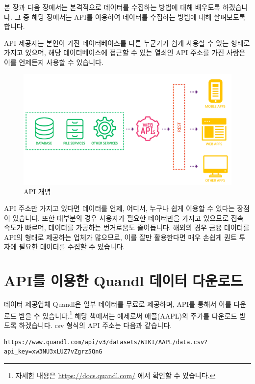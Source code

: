 \documentclass[]{book}
\let\rmarkdownfootnote\footnote%
\def\footnote{\protect\rmarkdownfootnote}
\begin{document}
본 장과 다음 장에서는 본격적으로 데이터를 수집하는 방법에 대해 배우도록 하겠습니다. 그 중 해당 장에서는 API를 이용하여 데이터를 수집하는 방법에 대해 살펴보도록 합니다.

API 제공자는 본인이 가진 데이터베이스를 다른 누군가가 쉽게 사용할 수 있는 형태로 가지고 있으며, 해당 데이터베이스에 접근할 수 있는 열쇠인 API 주소를 가진 사람은 이를 언제든지 사용할 수 있습니다.

\begin{figure}

{\centering \includegraphics{images/api_api} 

}

\caption{API 개념}\label{fig:unnamed-chunk-1}
\end{figure}

API 주소만 가지고 있다면 데이터를 언제, 어디서, 누구나 쉽게 이용할 수 있다는 장점이 있습니다. 또한 대부분의 경우 사용자가 필요한 데이터만을 가지고 있으므로 접속 속도가 빠르며, 데이터를 가공하는 번거로움도 줄어듭니다.
해외의 경우 금융 데이터를 API의 형태로 제공하는 업체가 많으므로, 이를 잘만 활용한다면 매우 손쉽게 퀀트 투자에 필요한 데이터를 수집할 수 있습니다.

\hypertarget{api--quandl--}{%
\section{API를 이용한 Quandl 데이터 다운로드}\label{api--quandl--}}

데이터 제공업체 Quandl은 일부 데이터를 무료로 제공하며, API를 통해서 이를 다운로드 받을 수 있습니다.\footnote{자세한 내용은 \url{https://docs.quandl.com/} 에서 확인할 수 있습니다.} 해당 책에서는 예제로써 애플(AAPL)의 주가를 다운로드 받도록 하겠습니다. csv 형식의 API 주소는 다음과 같습니다.

\begin{verbatim}
https://www.quandl.com/api/v3/datasets/WIKI/AAPL/data.csv?api_key=xw3NU3xLUZ7vZgrz5QnG
\end{verbatim}
\end{document}
